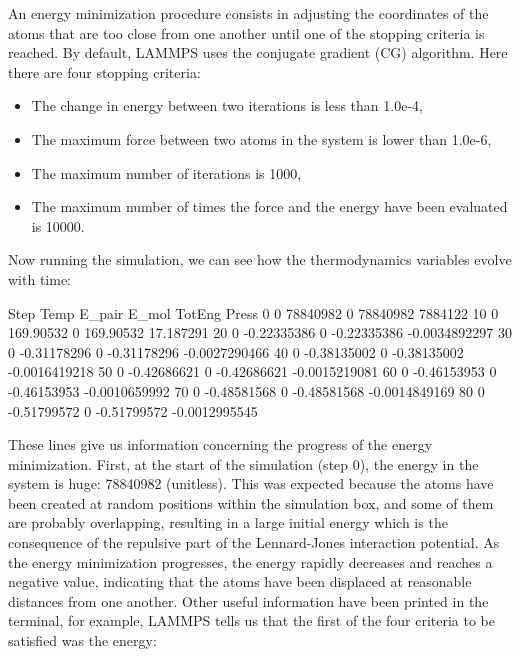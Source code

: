 \begin{tcolorbox}[colback=mylightblue!5!white,colframe=mylightblue!75!black,title=About energy minimization]
An energy minimization procedure consists in adjusting
the coordinates of the atoms that are too close from one another until one of the stopping
criteria is reached. By default, LAMMPS uses the conjugate gradient (CG) algorithm.
Here there are four stopping criteria:
\begin{itemize}
\item The change in energy between two iterations is less than 1.0e-4,
\item The maximum force between two atoms in the system is lower than 1.0e-6,
\item The maximum number of iterations is 1000,
\item The maximum number of times the force and the energy have been evaluated is 10000.
\end{itemize}
\end{tcolorbox}

\noindent Now running the simulation, we can see how the thermodynamics
variables evolve with time:

\begin{lcverbatim}
Step Temp         E_pair  E_mol       TotEng         Press
0       0       78840982      0     78840982       7884122 
10      0      169.90532      0    169.90532     17.187291 
20      0    -0.22335386      0  -0.22335386 -0.0034892297 
30      0    -0.31178296      0  -0.31178296 -0.0027290466 
40      0    -0.38135002      0  -0.38135002 -0.0016419218 
50      0    -0.42686621      0  -0.42686621 -0.0015219081 
60      0    -0.46153953      0  -0.46153953 -0.0010659992 
70      0    -0.48581568      0  -0.48581568 -0.0014849169 
80      0    -0.51799572      0  -0.51799572 -0.0012995545 
\end{lcverbatim}

\noindent These lines give us information concerning
the progress of the energy minimization. First, at the start
of the simulation (step 0), the energy in the system is
huge: 78840982 (unitless). This was expected because
the atoms have been created at random positions within the
simulation box, and some of them are probably overlapping,
resulting in a large initial energy which is the consequence
of the repulsive part of the Lennard-Jones interaction
potential. As the energy minimization progresses, the energy
rapidly decreases and reaches a negative value, indicating that the atoms have been
displaced at reasonable distances from one another. Other
useful information have been printed in the terminal, for
example, LAMMPS tells us that the first of the four criteria
to be satisfied was the energy:

